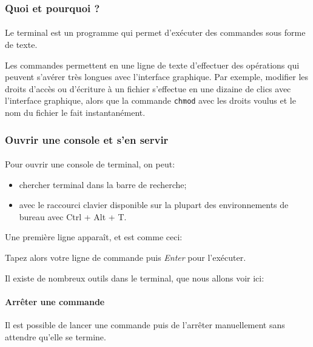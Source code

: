 \subsubsection{Quoi et pourquoi ?}

\paragraph{} Le terminal est un programme qui permet d'exécuter des commandes
sous forme de texte.

Les commandes permettent en une ligne de texte d'effectuer des
opérations qui peuvent s'avérer très longues avec l'interface graphique. Par
exemple, modifier les droits d'accès ou d'écriture à un fichier s'effectue en
une dizaine de clics avec l'interface graphique, alors que la commande
\texttt{chmod} avec les droits voulus et le nom du fichier le fait
instantanément.

\subsubsection{Ouvrir une console et s'en servir}

\paragraph{} Pour ouvrir une console de terminal, on peut:

\begin{itemize}
	\item chercher terminal dans la barre de recherche;
	\item avec le raccourci clavier disponible sur la plupart des
		environnements de bureau avec Ctrl + Alt + T.
\end{itemize}

Une première ligne apparaît, et est comme ceci:


Tapez alors votre ligne de commande puis \textit{Enter} pour l'exécuter.\newline

Il existe de nombreux outils dans le terminal, que nous allons voir ici:

\paragraph{Arrêter une commande} Il est possible de lancer une commande puis de
l'arrêter manuellement sans attendre qu'elle se termine.

